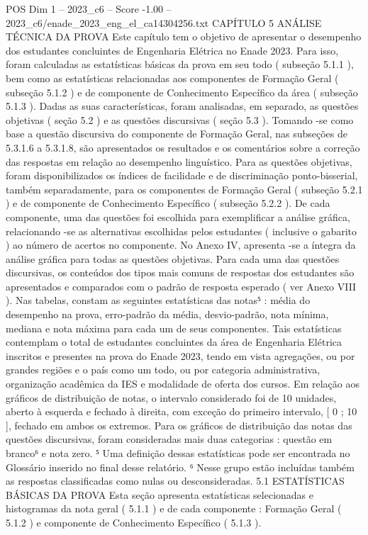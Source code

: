 \begin{textsample}{POS Dim 1 – 2023\_c6 – Score -1.00 – 2023\_c6/enade\_2023\_eng\_el\_ca14304256.txt}  \label{ex:f1_pos_232}
CAPÍTULO 5 ANÁLISE TÉCNICA DA PROVA Este capítulo tem o objetivo de apresentar o desempenho dos estudantes concluintes de Engenharia Elétrica no Enade 2023.
Para isso, foram calculadas as estatísticas básicas da prova em seu todo ( subseção 5.1.1 ), bem como as estatísticas relacionadas aos componentes de Formação Geral ( subseção 5.1.2 ) e de componente de Conhecimento Específico da área ( subseção 5.1.3 ).
Dadas as suas características, foram analisadas, em separado, as questões objetivas ( seção 5.2 ) e as questões discursivas ( seção 5.3 ).
Tomando -se como base a questão discursiva do componente de Formação Geral, nas subseções de 5.3.1.6 a 5.3.1.8, são apresentados os resultados e os comentários sobre a correção das respostas em relação ao desempenho linguístico.
Para as questões objetivas, foram disponibilizados os índices de facilidade e de discriminação ponto-bisserial, também separadamente, para os componentes de Formação Geral ( subseção 5.2.1 ) e de componente de Conhecimento Específico ( subseção 5.2.2 ).
De cada componente, uma das questões foi escolhida para exemplificar a análise gráfica, relacionando -se as alternativas escolhidas pelos estudantes ( inclusive o gabarito ) ao número de acertos no componente.
No Anexo IV, apresenta -se a íntegra da análise gráfica para todas as questões objetivas.
Para cada uma das questões discursivas, os conteúdos dos tipos mais comuns de respostas dos estudantes são apresentados e comparados com o padrão de resposta esperado ( ver Anexo VIII ).
Nas tabelas, constam as seguintes estatísticas das notas⁵ : média do desempenho na prova, erro-padrão da média, desvio-padrão, nota mínima, mediana e nota máxima para cada um de seus componentes.
Tais estatísticas contemplam o total de estudantes concluintes da área de Engenharia Elétrica inscritos e presentes na prova do Enade 2023, tendo em vista agregações, ou por grandes regiões e o país como um todo, ou por categoria administrativa, organização acadêmica da IES e modalidade de oferta dos cursos.
Em relação aos gráficos de distribuição de notas, o intervalo considerado foi de 10 unidades, aberto à esquerda e fechado à direita, com exceção do primeiro intervalo, [ 0 ; 10 ], fechado em ambos os extremos.
Para os gráficos de distribuição das notas das questões discursivas, foram consideradas mais duas categorias : questão em branco⁶ e nota zero. ⁵ Uma definição dessas estatísticas pode ser encontrada no Glossário inserido no final desse relatório. ⁶ Nesse grupo estão incluídas também as respostas classificadas como nulas ou desconsideradas. 5.1 ESTATÍSTICAS BÁSICAS DA PROVA Esta seção apresenta estatísticas selecionadas e histogramas da nota geral ( 5.1.1 ) e de cada componente : Formação Geral ( 5.1.2 ) e componente de Conhecimento Específico ( 5.1.3 ).

\end{textsample}
